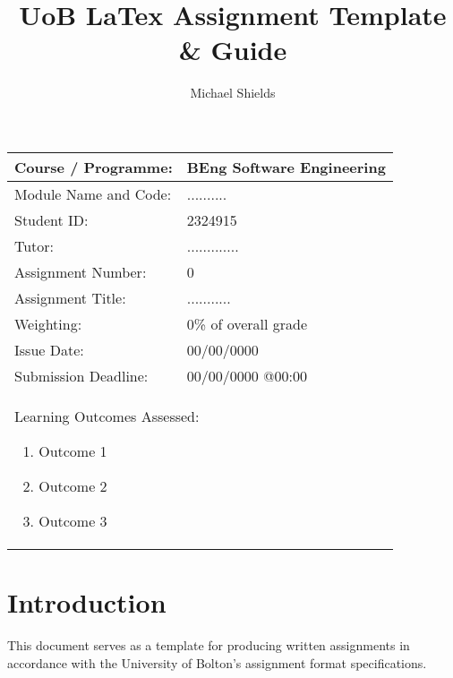 \documentclass[12pt]{article}
\title{UoB LaTex Assignment Template & Guide}
\author{Michael Shields}
\begin{document}
\begin{table}[h]
  \centering
  \begin{tabular}{|l|l|}
      \hline
      Course / Programme: & BEng Software Engineering \\
      \hline
      Module Name and Code: & .......... \\
      \hline
      Student ID: & 2324915 \\
      \hline
      Tutor: & ............. \\
      \hline
      Assignment Number: & 0 \\
      \hline
      Assignment Title: & ........... \\
      \hline
      Weighting: & 0\% of overall grade \\
      \hline
      Issue Date: & 00/00/0000 \\
      \hline
      Submission Deadline: & 00/00/0000 @00:00 \\
      \hline
      \multicolumn{2}{|l|}{
        \begin{minipage}{\dimexpr\textwidth-2\tabcolsep\relax} %
        \vspace{8pt} %
        Learning Outcomes Assessed:
          \begin{enumerate}
            \item Outcome 1
            \item Outcome 2
            \item Outcome 3
          \end{enumerate}
          \vspace{8pt} %
        \end{minipage}
      } \\
      \hline
  \end{tabular}
\end{table}

\newpage

\tableofcontents

\newpage 

\section{Introduction}
\label{sec:introduction}

This document serves as a template for producing written assignments in accordance with the University of Bolton's assignment format specifications.
\end{document}
